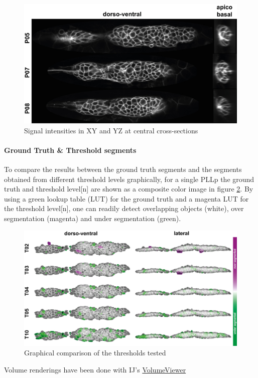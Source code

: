 \documentclass[11pt,singlespacinge,twoside]{reedthesis} %
\begin{document}
\begin{figure}

{\centering \includegraphics[width=0.5\linewidth]{figure/02-MaMo/GrTr/Morphology/signals} 

}

\caption{Signal intensities in XY and YZ at central cross-sections}\label{fig:stackmem}
\end{figure}
\hypertarget{ground-truth-threshold-segments}{%
\paragraph{Ground Truth \& Threshold segments}\label{ground-truth-threshold-segments}}

To compare the results between the ground truth segments and the segments obtained from different threshold levels graphically, for a single PLLp the ground truth and threshold level{[}n{]} are shown as a composite color image in figure \ref{fig:stackcomp}. By using a green lookup table (LUT) for the ground truth and a magenta LUT for the threshold level{[}n{]}, one can readily detect overlapping objects (white), over segmentation (magenta) and under segmentation (green).


\begin{figure}

{\centering \includegraphics[width=0.85\linewidth]{figure/02-MaMo/GrTr/Morphology/volumes} 

}

\caption{Graphical comparison of the thresholds tested}\label{fig:stackcomp}
\end{figure}
\noindent Volume renderings have been done with IJ's \href{\%22https://github.com/fiji/Volume_Viewer/releases/tag/Volume_Viewer-2.01.2\%22}{VolumeViewer}
\end{document}
